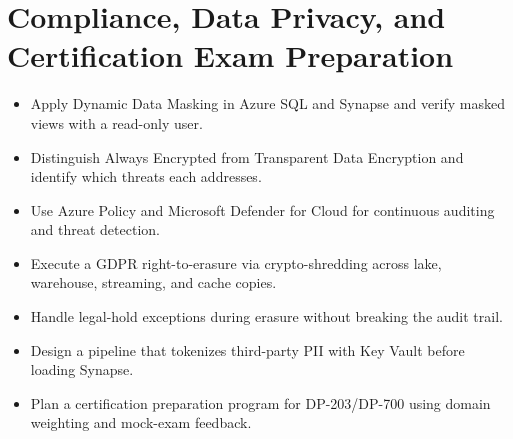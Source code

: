 \chapter{Compliance, Data Privacy, and Certification Exam Preparation}
%
\begin{objectives}
\begin{itemize}
    \item Apply Dynamic Data Masking in Azure SQL and Synapse and verify masked views with a read-only user.
    \item Distinguish Always Encrypted from Transparent Data Encryption and identify which threats each addresses.
    \item Use Azure Policy and Microsoft Defender for Cloud for continuous auditing and threat detection.
    \item Execute a GDPR right-to-erasure via crypto-shredding across lake, warehouse, streaming, and cache copies.
    \item Handle legal-hold exceptions during erasure without breaking the audit trail.
    \item Design a pipeline that tokenizes third-party PII with Key Vault before loading Synapse.
    \item Plan a certification preparation program for DP-203/DP-700 using domain weighting and mock-exam feedback.
\end{itemize}
\end{objectives}

